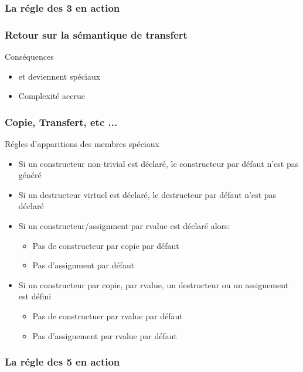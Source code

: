 \documentclass[svgnames]{beamer}
\begin{document}
\frame
{
  \frametitle{La régle des 3 en action}
}

\frame
{
  \frametitle{Retour sur la sémantique de transfert}
  \begin{center}\end{center}
  \begin{block}{Conséquences}
  \begin{itemize}
  \item {} et  deviennent spéciaux
  \item Complexité accrue
  \end{itemize}  
  \end{block}{}
}

\frame
{
  \frametitle{Copie, Transfert, etc ...}
  \begin{block}{Régles d'apparitions des membres spéciaux}
  \begin{itemize}
  \item  Si un constructeur non-trivial est déclaré, le constructeur par défaut n'est pas généré
   \item Si un destructeur virtuel est déclaré, le destructeur par défaut n'est pas déclaré
   \item Si un constructeur/assignment par rvalue est déclaré alors:
  \begin{itemize}
      \item Pas de constructeur par copie par défaut
      \item Pas d'assignment par défaut
  \end{itemize}
   \item  Si un constructeur par copie, par rvalue, un destructeur ou un assignement est défini
  \begin{itemize}
    \item Pas de constructuer par rvalue par défaut
    \item Pas d'assignement par rvalue par défaut
  \end{itemize}
  \end{itemize}
  \end{block}
}

\frame
{
  \frametitle{La régle des 5 en action}
}
\end{document}
